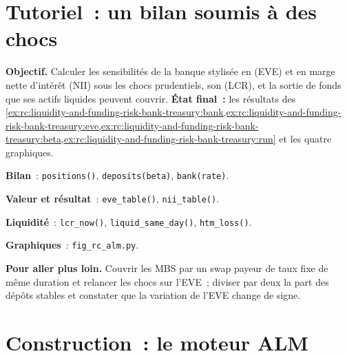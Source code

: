 \section{Tutoriel~: un bilan soumis à des chocs}\label{tut:rc:liquidity-and-funding-risk-bank-treasury:tutorial}

\begin{tutorial}
\textbf{Objectif.} Calculer les sensibilités de la banque stylisée en  (EVE) et en marge nette d'intérêt (NII) sous les chocs prudentiels,
son  (LCR), et la sortie de fonds que ses actifs liquides peuvent couvrir. \textbf{État final~:} les résultats des
\cref{ex:rc:liquidity-and-funding-risk-bank-treasury:bank,ex:rc:liquidity-and-funding-risk-bank-treasury:eve,ex:rc:liquidity-and-funding-risk-bank-treasury:beta,ex:rc:liquidity-and-funding-risk-bank-treasury:run}
et les quatre graphiques.
\begin{tutsteps}
\item \textbf{Bilan}~: \texttt{positions()}, \texttt{deposits(beta)}, \texttt{bank(rate)}.
\item \textbf{Valeur et résultat}~: \texttt{eve\_table()}, \texttt{nii\_table()}.
\item \textbf{Liquidité}~: \texttt{lcr\_now()}, \texttt{liquid\_same\_day()}, \texttt{htm\_loss()}.
\item \textbf{Graphiques}~: \texttt{fig\_rc\_alm.py}.
\end{tutsteps}
\textbf{Pour aller plus loin.} Couvrir les MBS par un swap payeur de taux fixe de même duration et relancer les
chocs sur l'EVE~; diviser par deux la part des dépôts stables et constater que la variation de l'EVE change de signe.
\end{tutorial}

\section{Construction~: le moteur ALM}\label{bld:rc:liquidity-and-funding-risk-bank-treasury:alm}


